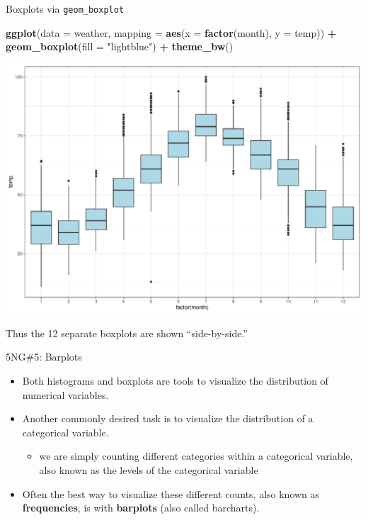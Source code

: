 \documentclass[
  ignorenonframetext,
]{beamer}
\newenvironment{Shaded}{\begin{snugshade}}{\end{snugshade}}
\newcommand{\AttributeTok}[1]{\textcolor[rgb]{0.13,0.29,0.53}{#1}}
\newcommand{\FunctionTok}[1]{\textcolor[rgb]{0.13,0.29,0.53}{\textbf{#1}}}
\newcommand{\NormalTok}[1]{#1}
\newcommand{\SpecialCharTok}[1]{\textcolor[rgb]{0.81,0.36,0.00}{\textbf{#1}}}
\newcommand{\StringTok}[1]{\textcolor[rgb]{0.31,0.60,0.02}{#1}}
\providecommand{\tightlist}{%
  \setlength{\itemsep}{0pt}\setlength{\parskip}{0pt}}
\begin{document}
\begin{frame}[fragile]{Boxplots via \texttt{geom\_boxplot}}
\protect\hypertarget{boxplots-via-geom_boxplot}{}
\tiny

\begin{Shaded}
\begin{Highlighting}[]
\FunctionTok{ggplot}\NormalTok{(}\AttributeTok{data =}\NormalTok{ weather, }\AttributeTok{mapping =} \FunctionTok{aes}\NormalTok{(}\AttributeTok{x =} \FunctionTok{factor}\NormalTok{(month), }\AttributeTok{y =}\NormalTok{ temp)) }\SpecialCharTok{+}
  \FunctionTok{geom\_boxplot}\NormalTok{(}\AttributeTok{fill =} \StringTok{"lightblue"}\NormalTok{) }\SpecialCharTok{+} 
  \FunctionTok{theme\_bw}\NormalTok{()}
\end{Highlighting}
\end{Shaded}

\begin{center}\includegraphics[width=0.9\linewidth,height=0.5\textheight]{Week2_Lect_files/figure-beamer/unnamed-chunk-34-1} \end{center}
\normalsize

Thus the 12 separate boxplots are shown ``side-by-side.''
\end{frame}

\begin{frame}{5NG\#5: Barplots}
\protect\hypertarget{ng5-barplots}{}
\begin{itemize}
\item
  Both histograms and boxplots are tools to visualize the distribution
  of numerical variables.
\item
  Another commonly desired task is to visualize the distribution of a
  categorical variable.

  \begin{itemize}
  \tightlist
  \item
    we are simply counting different categories within a categorical
    variable, also known as the levels of the categorical variable
  \end{itemize}
\item
  Often the best way to visualize these different counts, also known as
  \textbf{frequencies}, is with \textbf{barplots} (also called
  barcharts).
\end{itemize}
\end{frame}
\end{document}
